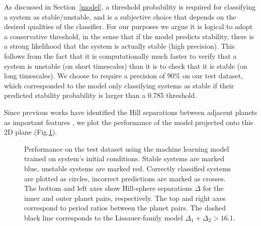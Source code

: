 As discussed in Section~\ref{model}, a threshold probability is required for classifying a system as stable/unstable, and is a subjective choice that depends on the desired qualities of the classifier.
For our purposes we argue it is logical to adopt a conservative threshold, in the sense that if the model predicts stability, there is a strong likelihood that the system is actually stable (high precision).
This follows from the fact that it is computationally much faster to verify that a system is unstable (on short timescales) than it is to check that it is stable (on long timescales).
We choose to require a precision of $90\%$ on our test dataset, which corresponded to the model only classifying systems as stable if their predicted stability probability is larger than a 0.785 threshold.

Since previous works have identified the Hill separations between adjacent planets as important features \citep{Chambers1996, Marzari14}, we plot the performance of the model projected onto this 2D plane (Fig.\:\ref{ariplot}).

\begin{figure}
 \centering {}
 \caption{
     Performance on the test dataset using the machine learning model trained on system's initial conditions.
     Stable systems are marked blue, unstable systems are marked red.  
     Correctly classified systems are plotted as circles, incorrect predictions are marked as crosses.
     The bottom and left axes show Hill-sphere separations $\Delta$ for the inner and outer planet pairs, respectively.
     The top and right axes correspond to period ratios between the planet pairs.
     The dashed black line corresponds to the Lissauer-family model $\Delta_1 + \Delta_2 > 16.1$.    
    \label{ariplot}}
\end{figure}


